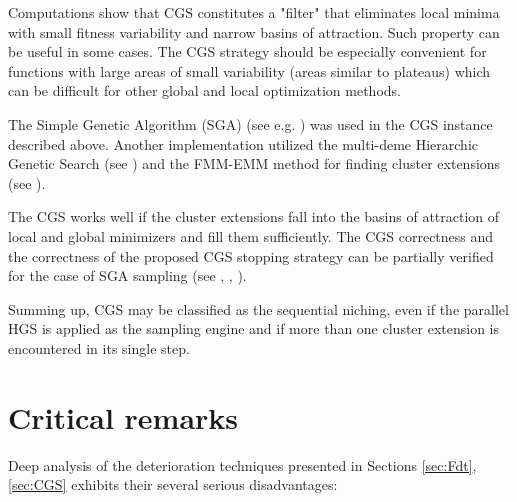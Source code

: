 Computations show that CGS constitutes a "filter" that eliminates local
minima with small fitness variability and narrow basins of attraction.
Such property can be useful in some cases. The CGS strategy should
be especially convenient for functions with large areas of small variability
(areas similar to plateaus) which can be difficult
for other global and local optimization methods.

The Simple Genetic Algorithm (SGA) (see e.g. \cite{Schaefer2007}) 
was used in the CGS instance described above. 
Another implementation utilized the multi-deme Hierarchic Genetic Search
(see \cite{SchaeferKolodziej2003})
and the FMM-EMM method for finding cluster extensions 
(see \cite{SchaeferAdamska2004}).

The CGS works well if the cluster extensions fall into 
the basins of attraction of local and global minimizers and
fill them sufficiently. The CGS correctness and the correctness
of the proposed CGS stopping strategy can be partially verified
for the case of SGA sampling (see \cite{Telega1999}, 
\cite{SchaeferJablonski2001}, \cite{Schaefer2007}).

Summing up, CGS may be classified as the sequential niching, even if the
parallel HGS is applied as the sampling engine and if more than one
cluster extension is encountered in its single step.











\section{Critical remarks}
\label{sec:CritRem}

Deep analysis of the deterioration techniques presented in Sections
\ref{sec:Fdt}, \ref{sec:CGS}
exhibits their several serious disadvantages:

